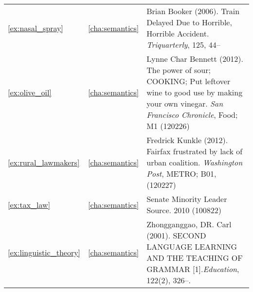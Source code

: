 \begin{longtable}{lcp{8.5cm}}
\ref{ex:nasal_spray}&\ref{cha:semantics}&Brian Booker (2006). Train Delayed Due to Horrible, Horrible Accident. \emph{Triquarterly}, 125, 44--\\
\ref{ex:olive_oil}&\ref{cha:semantics}&Lynne Char Bennett (2012). The power of sour; COOKING; Put leftover wine to good use by making your own vinegar. \emph{San Francisco Chronicle}, Food; M1  (120226)\\
\ref{ex:rural_lawmakers}&\ref{cha:semantics}&Fredrick Kunkle (2012). Fairfax frustrated by lack of urban coalition. \emph{Washington Post}, METRO; B01, (120227)\\
\ref{ex:tax_law}&\ref{cha:semantics}&Senate Minority Leader Source. 2010 (100822)\\
\ref{ex:linguistic_theory}&\ref{cha:semantics}&Zhongganggao, DR. Carl (2001). SECOND LANGUAGE LEARNING AND THE TEACHING OF GRAMMAR [1].\emph{Education}, 122(2), 326--.\\

\end{longtable}
